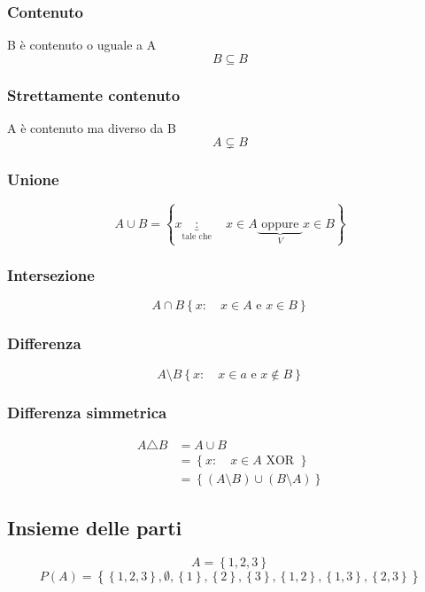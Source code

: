 \subsubsection{Contenuto} \quad B è contenuto o uguale a A
\[
	B \subseteq B
\]
\subsubsection{Strettamente contenuto} \quad A è contenuto ma diverso da B
\[
	A \subsetneq B
\]
\subsubsection{Unione}
\[
	A \cup B = \left\{ x\underbrace{:}_{\text{tale che}} \quad  x \in A \underbrace{\text{ oppure }}_{V} x \in B \right\}
\]
\subsubsection{Intersezione}
\[
	A \cap B \left\{ x : \quad x \in A \text{ e } x \in B \right\}
\]
\subsubsection{Differenza}
\[
	A \setminus     B \left\{ x: \quad x \in a \text{ e } x \not\in B \right\}
\]
\subsubsection{Differenza simmetrica}

\begin{align*}
	A \triangle B & = A \cup B                                                                            \\
	              & = \left\{  x: \quad  x \in A \text{ XOR }\right\}                                     \\
	              & = \left\{ \left( A \setminus B  \right)  \cup \left( B \setminus A \right)   \right\}
\end{align*}
\subsection{Insieme delle parti}
\label{sec:insiemedelleparti}
\[
	A = \left\{ 1,2,3 \right\}
\]
\[
	P(A) = \left\{ \left\{ 1,2,3 \right\}, \emptyset , \left\{ 1 \right\}, \left\{ 2  \right\} , \left\{ 3 \right\} , \left\{ 1,2 \right\} , \left\{ 1,3 \right\} , \left\{ 2,3 \right\}   \right\}
\]

